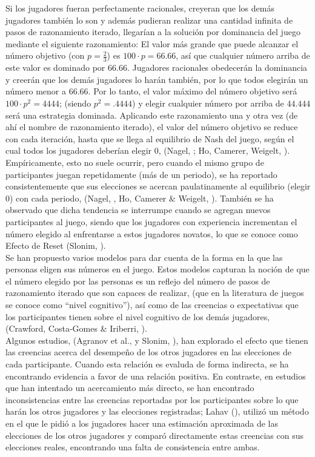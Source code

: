 Si los jugadores fueran perfectamente racionales, creyeran que los demás jugadores también lo son y además pudieran realizar una cantidad infinita de pasos de razonamiento iterado, llegarían a la solución por dominancia del juego mediante el siguiente razonamiento: El valor más grande que puede alcanzar el número objetivo (con $p = \frac{2}{3}$) es $100 \cdot p = 66.66$, así que cualquier número arriba de este valor es dominado por $66.66$. Jugadores racionales obedecerán la dominancia y creerán que los demás jugadores lo harán también, por lo que todos elegirán un número menor a $66.66$. Por lo tanto, el valor máximo del número objetivo será $100 \cdot p^2 = 44
44$; (siendo $p^2=.4444$) y elegir cualquier número por arriba de $44.444$ será una estrategia dominada. Aplicando este razonamiento una y otra vez (de ahí el nombre de razonamiento iterado), el valor del número objetivo se reduce con cada iteración, hasta que se llega al equilibrio de Nash del juego, según el cual todos los jugadores deberían elegir $0$, (Nagel, \citeyear{Nagel}; Ho, Camerer, Weigelt, \citeyear{Ho}).\\

Empíricamente, esto no suele ocurrir, pero cuando el mismo grupo de participantes juegan repetidamente (más de un periodo), se ha reportado consistentemente que sus elecciones se acercan paulatinamente al equilibrio (elegir $0$) con cada periodo, (Nagel, \citeyear{Nagel}, Ho, Camerer & Weigelt, \citeyear{Ho}). También se ha observado que dicha tendencia se interrumpe cuando se agregan nuevos participantes al juego, siendo que los jugadores con experiencia incrementan el número elegido al enfrentarse a estos jugadores novatos, lo que se conoce como Efecto de Reset (Slonim, \citeyear{Slonim}).\\

Se han propuesto varios modelos para dar cuenta de la forma en la que las personas eligen sus números en el juego. Estos modelos capturan la noción de que el número elegido por las personas es un reflejo del número de pasos de razonamiento iterado que son capaces de realizar, (que en la literatura de juegos se conoce como “nivel cognitivo”), así como de las creencias o expectativas que los participantes tienen sobre el nivel cognitivo de los demás jugadores, (Crawford, Costa-Gomes & Iriberri, \citeyear{Crawford}).\\

Algunos estudios, (Agranov et al., \citeyear{Agranov} y Slonim, \citeyear{Slonim}),  han explorado el efecto que tienen las creencias acerca del desempeño de los otros jugadores en las elecciones de cada participante. Cuando esta relación es evaluda de forma indirecta, se ha encontrando evidencia a favor de una relación positiva. En contraste, en estudios que han intentado un acercamiento más directo, se han encontrado inconsistencias entre las creencias reportadas por los participantes sobre lo que harán los otros jugadores y las elecciones registradas; Lahav (\citeyear{Lahav}), utilizó un método en el que le pidió a los jugadores hacer una estimación aproximada de las elecciones de los otros jugadores y comparó directamente estas creencias con sus elecciones reales, encontrando una falta de consistencia entre ambas.\\

